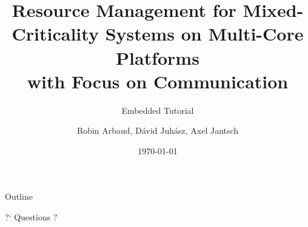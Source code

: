 \documentclass{beamer}
\title{Resource Management for Mixed-Criticality Systems on Multi-Core Platforms\\with Focus on Communication}
\subtitle{Embedded Tutorial}
\author{Robin Arbaud, D\'avid Juh\'asz, Axel Jantsch}
\institute{DSD 2018, Prague, Czech Republic}
\date{\today}
\begin{document}
\begin{frame}
  \titlepage
\end{frame}      

\begin{frame}{Outline}
  \tableofcontents[subsectionstyle=hide]
\end{frame}
 

   











\begin{frame}{}

  \centering\Huge
  ?` Questions ?
\end{frame}

\end{document}
